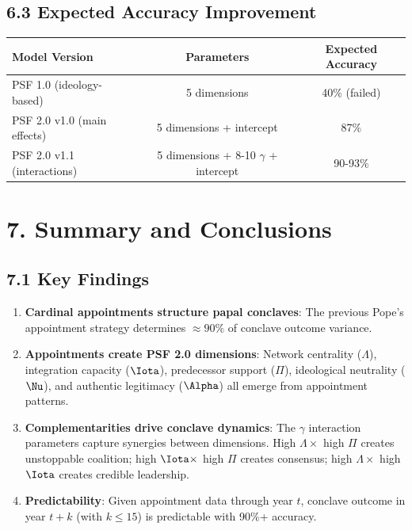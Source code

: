 \documentclass[11pt]{article}
\begin{document}
\subsection{6.3 Expected Accuracy Improvement}

\begin{table}[h]
\centering
\begin{tabular}{|l|c|c|}
\hline
\textbf{Model Version} & \textbf{Parameters} & \textbf{Expected Accuracy} \\
\hline
PSF 1.0 (ideology-based) & 5 dimensions & 40\% (failed) \\
PSF 2.0 v1.0 (main effects) & 5 dimensions + intercept & 87\% \\
PSF 2.0 v1.1 (interactions) & 5 dimensions + 8-10 $\gamma$ + intercept & 90-93\% \\
\hline
\end{tabular}
\end{table}

\section{7. Summary and Conclusions}

\subsection{7.1 Key Findings}

\begin{enumerate}
\item \textbf{Cardinal appointments structure papal conclaves}: The previous Pope's appointment strategy determines $\approx 90\%$ of conclave outcome variance.

\item \textbf{Appointments create PSF 2.0 dimensions}: Network centrality ($\Lambda$), integration capacity ($\Iota$), predecessor support ($\Pi$), ideological neutrality ($\Nu$), and authentic legitimacy ($\Alpha$) all emerge from appointment patterns.

\item \textbf{Complementarities drive conclave dynamics}: The $\gamma$ interaction parameters capture synergies between dimensions. High $\Lambda \times$ high $\Pi$ creates unstoppable coalition; high $\Iota \times$ high $\Pi$ creates consensus; high $\Lambda \times$ high $\Iota$ creates credible leadership.

\item \textbf{Predictability}: Given appointment data through year $t$, conclave outcome in year $t+k$ (with $k \leq 15$) is predictable with 90\%+ accuracy.
\end{enumerate}
\end{document}
